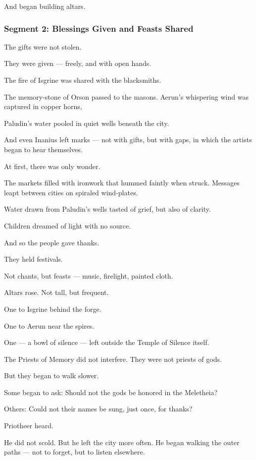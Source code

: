 \documentclass[9pt]{article}
\begin{document}
And began building altars.


\newpage

\subsubsection*{Segment 2: Blessings Given and Feasts Shared}

The gifts were not stolen.  

They were given — freely, and with open hands.

The fire of Isgrine was shared with the blacksmiths.  

The memory-stone of Orson passed to the masons.  
Aerun’s whispering wind was captured in copper horns,  

Paludin’s water pooled in quiet wells beneath the city.  

And even Inanius left marks —  
not with gifts, but with gaps,  
in which the artists began to hear themselves.

At first, there was only wonder.

The markets filled with ironwork that hummed faintly when struck.  
Messages leapt between cities on spiraled wind-plates.  

Water drawn from Paludin’s wells tasted of grief, but also of clarity.  

Children dreamed of light with no source.

And so the people gave thanks.

They held festivals. 

Not chants, but feasts — music, firelight, painted cloth.

Altars rose. Not tall, but frequent.

One to Isgrine behind the forge.  

One to Aerun near the spires.  

One — a bowl of silence — left outside the Temple of Silence itself.

The Priests of Memory did not interfere.  
They were not priests of gods.

But they began to walk slower.

Some began to ask:  
Should not the gods be honored in the Meletheia?

Others:  
Could not their names be sung, just once, for thanks?

Priotheer heard.

He did not scold.  
But he left the city more often.  
He began walking the outer paths — not to forget, but to listen elsewhere.
\end{document}
